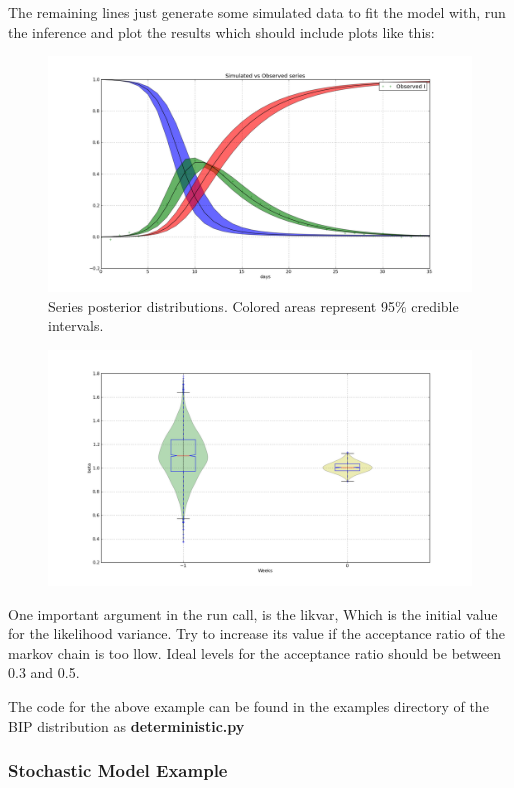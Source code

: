 \documentclass[a4paper,10pt,english]{manual}
\begin{document}
The remaining lines just generate some simulated data to fit the model with, run the inference and plot the results which should include plots like this:
\begin{figure}[htbp]
\centering

\includegraphics[width=15cm]{fit_series.png}
\caption{Series posterior distributions. Colored areas represent 95\% credible intervals.}\end{figure}
\begin{figure}[htbp]
\centering

\includegraphics[width=15cm]{fit_par.png}
\end{figure}

One important argument in the run call, is the likvar, Which is the initial value for the likelihood variance. Try to increase its value if the acceptance ratio of the markov chain is too llow. Ideal levels for the acceptance ratio should be between 0.3 and 0.5.

The code for the above example can be found in the examples directory of the BIP distribution as \textbf{deterministic.py}


\subsubsection{Stochastic Model Example}
\end{document}
